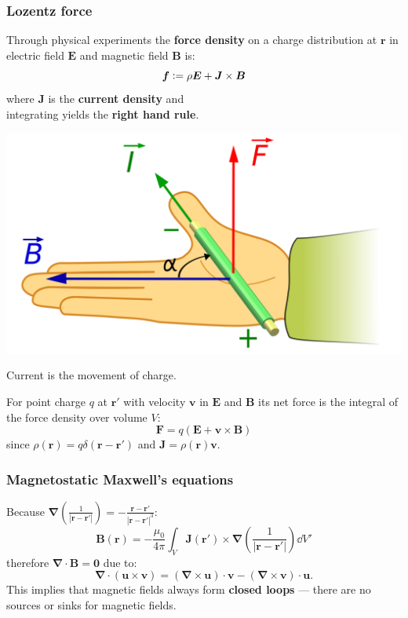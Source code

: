 \documentclass{article}
\newcommand{\deq}{\vcentcolon=}
\newcommand{\vc}[1]{\boldsymbol{#1}}
\begin{document}
\begin{multicols*}{3}
\newcolumn

\subsubsection*{Lozentz force}
Through physical experiments the \textbf{force density}
on a charge distribution at $\vc{r}$
in electric field $\vc{E}$ and magnetic field $\vc{B}$ is:
$$\vc{f}\deq\rho\vc{E}+\vc{J}\times\vc{B}$$
where $\vc{J}$ is the \textbf{current density}
and \\ integrating yields the \textbf{right hand rule}.
\begin{center}
    \includegraphics[scale=0.05]{f7.png}
\end{center}
Current is the movement of charge.

For point charge $q$ at $\vc{r}'$ with velocity $\vc{v}$
in $\vc{E}$ and $\vc{B}$ its net force is the integral of the
force density over volume $V$:
$$\vc{F}=q(\vc{E}+\vc{v}\times\vc{B})$$
since $\rho(\vc{r})=q\delta(\vc{r}-\vc{r}')$
and $\vc{J}=\rho(\vc{r})\vc{v}$.

\subsubsection*{Magnetostatic Maxwell's equations}
Because $\displaystyle\vc{\nabla}\left(
\frac{1}{|\vc{r}-\vc{r}'|}\right)
=-\frac{\vc{r}-\vc{r}'}{|\vc{r}-\vc{r}'|^3}$:
$$\vc{B}(\vc{r})=-\frac{\mu_0}{4\pi}\int_V
\vc{J}(\vc{r}')\times\vc{\nabla}
\left(\frac{1}{|\vc{r}-\vc{r}'|}\right)\dd V'$$
therefore $\vc{\nabla}\cdot\vc{B}=\vc{0}$ due to:
$$\vc{\nabla}\cdot(\vc{u}\times\vc{v})
=(\vc{\nabla}\times\vc{u})\cdot\vc{v}
-(\vc{\nabla}\times\vc{v})\cdot\vc{u}.$$
This implies that magnetic fields always form
\textbf{closed loops} --- there are no sources
or sinks for magnetic fields.


\end{multicols*}
\end{document}
